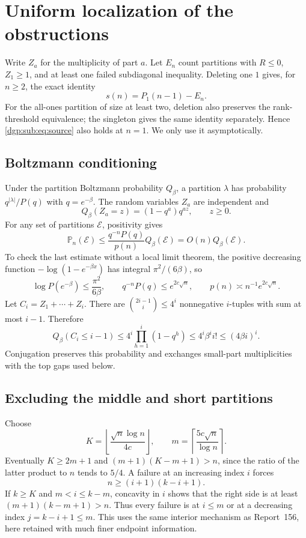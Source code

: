 \documentclass[11pt,letterpaper]{article}
\numberwithin{equation}{section}
\theoremstyle{remark}\newtheorem{remark}[theorem]{Remark}
\newcommand{\PP}{\mathbb P}
\newcommand{\floor}[1]{\left\lfloor #1\right\rfloor}
\newcommand{\ceil}[1]{\left\lceil #1\right\rceil}
\begin{document}
\section{Uniform localization of the obstructions}\label{dgp:sub:sec:localize}
Write $Z_a$ for the multiplicity of part $a$. Let $E_n$ count
partitions with $R\leq0$, $Z_1\geq1$, and at least one failed
subdiagonal inequality. Deleting one $1$ gives, for $n\geq2$, the
exact identity
\begin{equation}\label{dgp:sub:eq:source}
 s(n)=P_1(n-1)-E_n.
\end{equation}
For the all-ones partition of size at least two, deletion also
preserves the rank-threshold equivalence; the singleton gives the
same identity separately. Hence \eqref{dgp:sub:eq:source} also holds at
$n=1$. We only use it asymptotically.

\subsection{Boltzmann conditioning}
Under the partition Boltzmann probability $Q_\beta$, a partition
$\lambda$ has probability $q^{|\lambda|}/P(q)$ with $q=e^{-\beta}$.
The random variables $Z_a$ are independent and
\[
 Q_\beta(Z_a=z)=(1-q^a)q^{az},\qquad z\geq0.
\]
For any set of partitions $\mathcal E$, positivity gives
\begin{equation}\label{dgp:sub:eq:condition}
 \PP_n(\mathcal E)\leq\frac{q^{-n}P(q)}{p(n)}Q_\beta(\mathcal E)
                       =O(n)Q_\beta(\mathcal E).
\end{equation}
To check the last estimate without a local limit theorem, the positive
decreasing function $-\log(1-e^{-\beta x})$ has integral
$\pi^2/(6\beta)$, so
\[
 \log P(e^{-\beta})\leq\frac{\pi^2}{6\beta},\qquad
 q^{-n}P(q)\leq e^{2c\sqrt n},\qquad p(n)\asymp n^{-1}e^{2c\sqrt n}.
\]
Let $C_i=Z_1+\cdots+Z_i$. There are
$\binom{2i-1}{i}\leq4^i$ nonnegative $i$-tuples with sum at most
$i-1$. Therefore
\begin{equation}\label{dgp:sub:eq:Cbound}
 Q_\beta(C_i\leq i-1)\leq4^i\prod_{h=1}^i(1-q^h)
                    \leq4^i\beta^ii!\leq(4\beta i)^i.
\end{equation}
Conjugation preserves this probability and exchanges small-part
multiplicities with the top gaps used below.

\subsection{Excluding the middle and short partitions}
Choose
\begin{equation}\label{dgp:sub:eq:cutoffs}
 K=\floor{\frac{\sqrt n\log n}{4c}},\qquad
 m=\ceil{\frac{5c\sqrt n}{\log n}}.
\end{equation}
Eventually $K\geq2m+1$ and $(m+1)(K-m+1)>n$, since the ratio of
the latter product to $n$ tends to $5/4$.
A failure at an increasing index $i$ forces
\[
 n\geq(i+1)(k-i+1).
\]
If $k\geq K$ and $m<i\leq k-m$, concavity in $i$ shows that the
right side is at least $(m+1)(k-m+1)>n$. Thus every failure is at
$i\leq m$ or at a decreasing index $j=k-i+1\leq m$.
This uses the same interior mechanism as Report~156, here retained
with much finer endpoint information.
\end{document}
